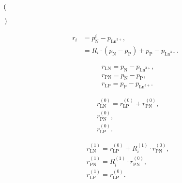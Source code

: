 \documentclass[a4paper,11pt,twoside,openright]{book}
\def\lthtmlcheckvsize{\ifdim\ht\sizebox<\vsize 
  \ifdim\wd\sizebox<\hsize\expandafter\hfill\fi \expandafter\vfill
  \else\expandafter\vss\fi}%
\begin{document}
{\newpage\clearpage
{}%
$\displaystyle \left(\vphantom{ p_{\textrm{N}} - p_{\textrm{P}} }\right.$%
\lthtmlindisplaymathZ
\lthtmlcheckvsize\clearpage}

{\newpage\clearpage
{}%
$\displaystyle \left.\vphantom{ p_{\textrm{N}} - p_{\textrm{P}} }\right)$%
\lthtmlindisplaymathZ
\lthtmlcheckvsize\clearpage}

{\newpage\clearpage
\setcounter{equation}{54}
%
\begin{subequations}\begin{align}
r_i &= p_{\textrm{N}}^i - p_{\textrm{Ln}^{3+}} , \\
&= R_i \cdot \left( p_{\textrm{N}} - p_{\textrm{P}} \right) + p_{\textrm{P}} - p_{\textrm{Ln}^{3+}} .\end{align}\end{subequations}%
\lthtmldisplayZ
\lthtmlcheckvsize\clearpage}

{\newpage\clearpage
\setcounter{equation}{55}
%
\begin{subequations}\begin{align}
& r_{\textrm{LN}} = p_{\textrm{N}} - p_{\textrm{Ln}^{3+}} , \\
& r_{\textrm{PN}} = p_{\textrm{N}} - p_{\textrm{P}} , \\
& r_{\textrm{LP}} = p_{\textrm{P}} - p_{\textrm{Ln}^{3+}} .
\end{align}\end{subequations}%
\lthtmldisplayZ
\lthtmlcheckvsize\clearpage}

{\newpage\clearpage
\setcounter{equation}{56}
%
\begin{subequations}\begin{align}
& r_{\textrm{LN}}^{(0)} = r_{\textrm{LP}}^{(0)} + r_{\textrm{P} \textrm{N}}^{(0)} , \\
& r_{\textrm{PN}}^{(0)} , \\
& r_{\textrm{LP}}^{(0)} .
\end{align}\end{subequations}%
\lthtmldisplayZ
\lthtmlcheckvsize\clearpage}

{\newpage\clearpage
\setcounter{equation}{57}
%
\begin{subequations}\begin{align}
& r_{\textrm{LN}}^{(1)} = r_{\textrm{LP}}^{(0)} + R_i^{(1)} \cdot r_{\textrm{P} \textrm{N}}^{(0)} , \\
& r_{\textrm{PN}}^{(1)} = R_i^{(1)} \cdot r_{\textrm{P} \textrm{N}}^{(0)}, \\
& r_{\textrm{LP}}^{(1)} = r_{\textrm{LP}}^{(0)}.
\end{align}\end{subequations}%
\lthtmldisplayZ
\lthtmlcheckvsize\clearpage}
\end{document}
